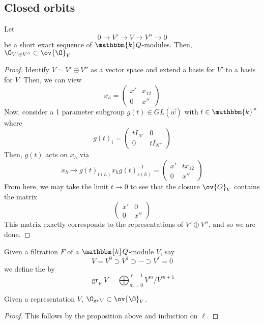 \documentclass[11pt,leqno,oneside]{amsbook}
\numberwithin{thm}{section}
\newcommand{\bbk}{\mathbbm{k}} %
\renewcommand{\Q}{Q} %
\newcommand{\gr}{\operatorname{gr}} %
\begin{document}
\subsection{Closed orbits}
\begin{prop}
  Let \[
    0 \to V' \to V \to V'' \to 0
  \]
  be a short exact sequence of \(\bbk \Q\)-modules. Then, \(\O_{V'
    \oplus V''} \subset \ov{\O}_V\)
\end{prop}
\begin{proof}
  Identify \(V = V' \oplus V''\) as a vector space and extend a basis
  for \(V'\) to a basis for \(V\). Then, we can view \[
    x_h = \left(
      \begin{array}{cc}
        x'& x_{12} \\
        0 & x''
      \end{array}
    \right)
  \]
  Now, consider a 1 parameter subgroup \(g(t) \in GL(\vec{w})\) with
  \(t \in \bbk^\times\) where \[
    g(t)_i = \left(
      \begin{array}{cc}
        t I_{N'} & 0 \\
        0 & t I_{N''}
      \end{array}
    \right)
  \]
  Then, \(g(t)\) acts on \(x_h\) via \[
    x_h \mapsto g(t)_{t(h)} x_h g(t)_{s(h)}^{-1} =
    \left(
      \begin{array}{cc}
        x' & t x_{12} \\
        0  & x''
      \end{array}
    \right)
  \]
  From here, we may take the limit \(t \to 0\) to see that the closure
  \(\ov{O}_V\) contains the matrix \[
    \left(
      \begin{array}{cc}
        x' & 0 \\
        0 & x''
      \end{array}
    \right)
  \]
  This matrix exactly corresponds to the representations of \(V'
  \oplus V''\), and so we are done.
\end{proof}
\begin{defn}
  Given a filtration \(F\) of a \(\bbk Q\)-module \(V\), say \[
    V = V^0 \supset V^1 \supset \cdots \supset V^\ell = 0
  \]
  we define the  by \[
    \gr_F V = \bigoplus_{m=0}^{\ell-1} V^m / V^{m+1}
  \]
\end{defn}
\begin{prop}
  Given a representation \(V\), \(\O_{\gr V} \subset \ov{\O}_V\).
\end{prop}
\begin{proof}
  This follows by the proposition above and induction on
  \(\ell\). 
\end{proof}
\end{document}
